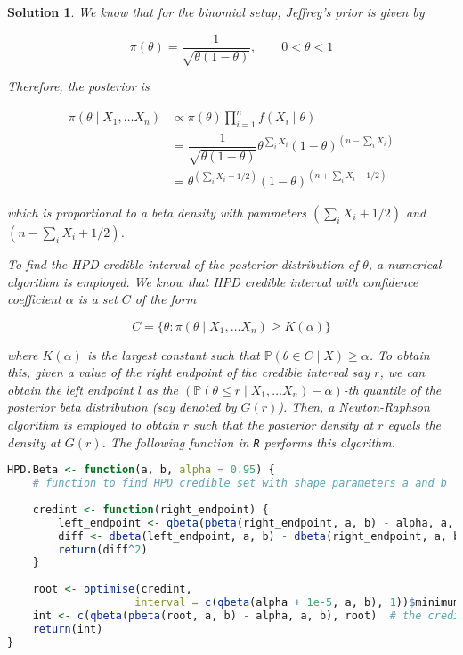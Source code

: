 \documentclass[12pt]{article}
\theoremstyle{problemstyle}
\newtheorem*{solution*}{Solution}
\newcommand{\prob}{\mathbb{P}}
\begin{document}
\begin{solution*}
    We know that for the binomial setup, Jeffrey's prior is given by 

    $$
    \pi(\theta) = \dfrac{1}{\sqrt{\theta(1 - \theta)}}, \qquad 0 < \theta < 1
    $$

    Therefore, the posterior is 

    \begin{align*}
        \pi(\theta \mid X_1, \dots X_n)
        & \propto \pi(\theta) \prod_{i = 1}^{n} f(X_i \mid \theta)\\
        & = \dfrac{1}{\sqrt{\theta(1 - \theta)}} \theta^{\sum_i X_i} (1 - \theta)^{(n - \sum_i X_i)}\\
        & = \theta^{(\sum_i X_i - 1/2)} (1 - \theta)^{(n + \sum_i X_i - 1/2)}
    \end{align*}

    which is proportional to a beta density with parameters $(\sum_i X_i + 1/2)$ and $(n - \sum_i X_i + 1/2)$.

    To find the HPD credible interval of the posterior distribution of $\theta$, a numerical algorithm is employed. We know that HPD credible interval with confidence coefficient $\alpha$ is a set $C$ of the form 

    $$
        C = \{ \theta : \pi(\theta \mid X_1, \dots X_n) \geq K(\alpha) \}    
    $$

    where $K(\alpha)$ is the largest constant such that $\prob(\theta \in C \mid X) \geq \alpha$. To obtain this, given a value of the right endpoint of the credible interval say $r$, we can obtain the left endpoint $l$ as the $(\prob(\theta \leq r \mid X_1, \dots X_n) - \alpha)$-th quantile of the posterior beta distribution (say denoted by $G(r)$). Then, a Newton-Raphson algorithm is employed to obtain $r$ such that the posterior density at $r$ equals the density at $G(r)$. The following function in \texttt{R} performs this algorithm.

    \begin{lstlisting}[language = R]
HPD.Beta <- function(a, b, alpha = 0.95) {
    # function to find HPD credible set with shape parameters a and b
    
    credint <- function(right_endpoint) {
        left_endpoint <- qbeta(pbeta(right_endpoint, a, b) - alpha, a, b) 
        diff <- dbeta(left_endpoint, a, b) - dbeta(right_endpoint, a, b)
        return(diff^2)
    }
    
    root <- optimise(credint, 
                    interval = c(qbeta(alpha + 1e-5, a, b), 1))$minimum
    int <- c(qbeta(pbeta(root, a, b) - alpha, a, b), root)  # the credible interval
    return(int)
}
    \end{lstlisting}


\end{solution*}
\end{document}
